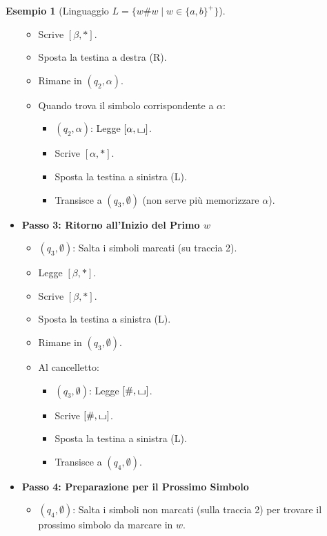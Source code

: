 \documentclass[a4paper]{article}
\theoremstyle{definition} %
\newtheorem{example}{Esempio}
\newcommand{\blankS}{\ensuremath{\raisebox{-0.15ex}{\scalebox{1.3}[0.7]{$\sqcup$}}}}
\begin{document}
\begin{example}[Linguaggio $L = \{w\#w \mid w \in \{a,b\}^+\}$]
\begin{itemize}
\begin{itemize}
            \item Scrive $[\beta, *]$.
            \item Sposta la testina a destra (R).
            \item Rimane in $(q_2, \alpha)$.
            \item Quando trova il simbolo corrispondente a $\alpha$:
                \begin{itemize}
                    \item $(q_2, \alpha)$: Legge $[\alpha, \blankS]$.
                    \item Scrive $[\alpha, *]$.
                    \item Sposta la testina a sinistra (L).
                    \item Transisce a $(q_3, \emptyset)$ (non serve più memorizzare $\alpha$).
                \end{itemize}
        \end{itemize}
    \item \textbf{Passo 3: Ritorno all'Inizio del Primo $w$}
        \begin{itemize}
            \item $(q_3, \emptyset)$: Salta i simboli marcati (su traccia 2).
            \item Legge $[\beta, *]$.
            \item Scrive $[\beta, *]$.
            \item Sposta la testina a sinistra (L).
            \item Rimane in $(q_3, \emptyset)$.
            \item Al cancelletto:
                \begin{itemize}
                    \item $(q_3, \emptyset)$: Legge $[\#, \blankS]$.
                    \item Scrive $[\#, \blankS]$.
                    \item Sposta la testina a sinistra (L).
                    \item Transisce a $(q_4, \emptyset)$.
                \end{itemize}
        \end{itemize}
    \item \textbf{Passo 4: Preparazione per il Prossimo Simbolo}
        \begin{itemize}
            \item $(q_4, \emptyset)$: Salta i simboli non marcati (sulla traccia 2) per trovare il prossimo simbolo da marcare in $w$.

\end{itemize}
\end{itemize}
\end{example}
\end{document}
